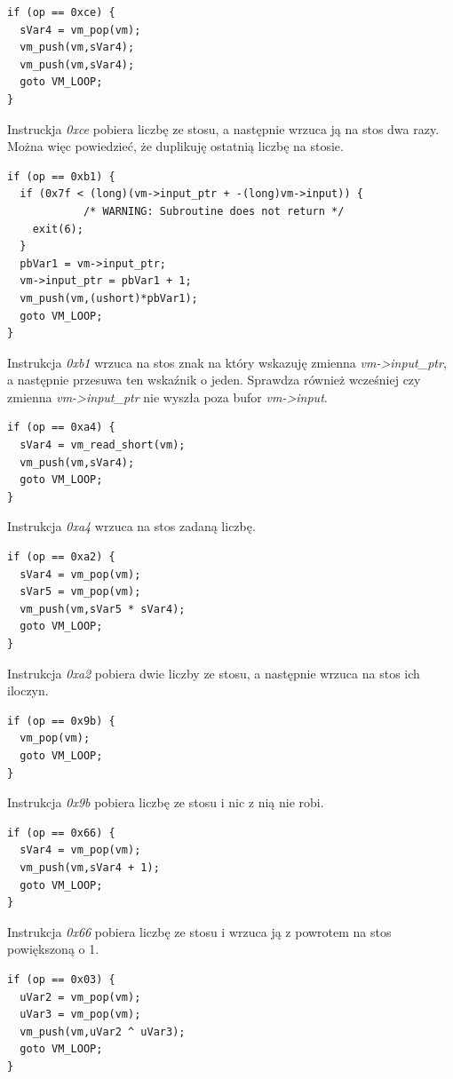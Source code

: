 \documentclass[language=polish,type=eng]{aghmodern}
\begin{document}
\begin{verbatim}
if (op == 0xce) {
  sVar4 = vm_pop(vm);
  vm_push(vm,sVar4);
  vm_push(vm,sVar4);
  goto VM_LOOP;
}
\end{verbatim}

Instruckja \emph{0xce} pobiera liczbę ze stosu, a następnie wrzuca ją na stos dwa razy.
Można więc powiedzieć, że duplikuję ostatnią liczbę na stosie.

\begin{verbatim}
if (op == 0xb1) {
  if (0x7f < (long)(vm->input_ptr + -(long)vm->input)) {
            /* WARNING: Subroutine does not return */
    exit(6);
  }
  pbVar1 = vm->input_ptr;
  vm->input_ptr = pbVar1 + 1;
  vm_push(vm,(ushort)*pbVar1);
  goto VM_LOOP;
}
\end{verbatim}

Instrukcja \emph{0xb1} wrzuca na stos znak na który wskazuję zmienna \emph{vm->input\_ptr},
a następnie przesuwa ten wskaźnik o jeden. Sprawdza również wcześniej czy zmienna
\emph{vm->input\_ptr} nie wyszła poza bufor \emph{vm->input}.

\begin{verbatim}
if (op == 0xa4) {
  sVar4 = vm_read_short(vm);
  vm_push(vm,sVar4);
  goto VM_LOOP;
}
\end{verbatim}

Instrukcja \emph{0xa4} wrzuca na stos zadaną liczbę.

\begin{verbatim}
if (op == 0xa2) {
  sVar4 = vm_pop(vm);
  sVar5 = vm_pop(vm);
  vm_push(vm,sVar5 * sVar4);
  goto VM_LOOP;
}
\end{verbatim}

Instrukcja \emph{0xa2} pobiera dwie liczby ze stosu, a następnie wrzuca na stos ich iloczyn.

\begin{verbatim}
if (op == 0x9b) {
  vm_pop(vm);
  goto VM_LOOP;
}
\end{verbatim}

Instrukcja \emph{0x9b} pobiera liczbę ze stosu i nic z nią nie robi.

\begin{verbatim}
if (op == 0x66) {
  sVar4 = vm_pop(vm);
  vm_push(vm,sVar4 + 1);
  goto VM_LOOP;
}
\end{verbatim}

Instrukcja \emph{0x66} pobiera liczbę ze stosu i wrzuca ją z powrotem na stos powiększoną o 1.

\begin{verbatim}
if (op == 0x03) {
  uVar2 = vm_pop(vm);
  uVar3 = vm_pop(vm);
  vm_push(vm,uVar2 ^ uVar3);
  goto VM_LOOP;
}
\end{verbatim}
\end{document}
